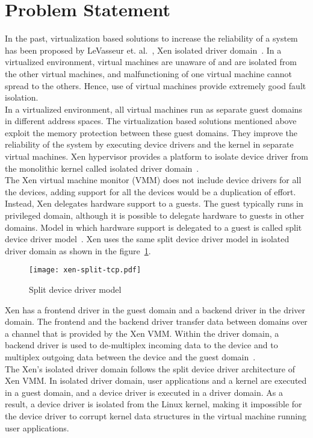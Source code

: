 \section {Problem Statement}
\label{sec:problem}
In the past, virtualization based solutions to increase the reliability of a system has been proposed by LeVasseur et. al.~\cite{LeVasseur04UnmodifiedDriverReuse}, Xen isolated driver domain~\cite{Fraser04safehardware}. In a virtualized environment, virtual machines are unaware of and are isolated from the other virtual machines, and malfunctioning of one virtual machine cannot spread to the others. Hence, use of virtual machines provide extremely good fault isolation. 
\\[3mm]
In a virtualized environment, all virtual machines run as separate guest domains in different address spaces. The virtualization based solutions mentioned above exploit the memory protection between these guest domains. They improve the reliability of the system by executing device drivers and the kernel in separate virtual machines. Xen hypervisor provides a platform to isolate device driver from the monolithic kernel called isolated driver domain~\cite{driverdomain}.
\\[3mm]
The Xen virtual machine monitor (VMM) does not include device drivers for all the devices, adding support for all the devices would be a duplication of effort. Instead, Xen delegates hardware support to a guests. The guest typically runs in privileged domain, although it is possible to delegate hardware to guests in other domains. Model in which hardware support is delegated to a guest is called split device driver model~\cite{Chisnall:2007:DGX:1407351}. Xen uses the same split device driver model in isolated driver domain as shown in the figure~\ref{fig:xen-split}.
\begin{figure}[!ht]
\centering
\texttt{[image: xen-split-tcp.pdf]}
\caption{Split device driver model}
\label{fig:xen-split}
\end{figure}
Xen has a frontend driver in the guest domain and a backend driver in the driver domain. The frontend and the backend driver transfer data between domains over a channel that is provided by the Xen VMM. Within the driver domain, a backend driver is used to de-multiplex incoming data to the device and to multiplex outgoing data between the device and the guest domain~\cite{driverdomain}.
\\[3mm]
The Xen's isolated driver domain follows the split device driver architecture of Xen VMM. In isolated driver domain, user applications and a kernel are executed in a guest domain, and a device driver is executed in a driver domain. As a result, a device driver is isolated from the Linux kernel, making it impossible for the device driver to corrupt kernel data structures in the virtual machine running user applications. 
